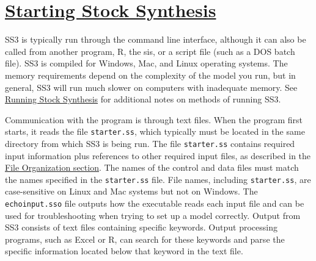 \pagebreak

\hypertarget{StartingSS3}{}
\section[Starting Stock Synthesis]{\protect\hyperlink{StartingSS3}{Starting Stock Synthesis}}
SS3 is typically run through the command line interface, although it can also be called from another program, R, the \gls{sis}, or a script file (such as a DOS batch file). SS3 is compiled for Windows, Mac, and Linux operating systems. The memory requirements depend on the complexity of the model you run, but in general, SS3 will run much slower on computers with inadequate memory. See \hyperref[sec:RunningSS3]{Running Stock Synthesis} for additional notes on methods of running SS3.

Communication with the program is through text files. When the program first starts, it reads the file \verb|starter.ss|, which typically must be located in the same directory from which SS3 is being run. The file \verb|starter.ss| contains required input information plus references to other required input files, as described in the \hyperref[FileOrganization]{File Organization section}. The names of the control and data files must match the names specified in the \verb|starter.ss| file. File names, including \verb|starter.ss|, are case-sensitive on Linux and Mac systems but not on Windows. The \verb|echoinput.sso| file outputs how the executable reads each input file and can be used for troubleshooting when trying to set up a model correctly. Output from SS3 consists of text files containing specific keywords. Output processing programs, such as Excel or R, can search for these keywords and parse the specific information located below that keyword in the text file.

\pagebreak
